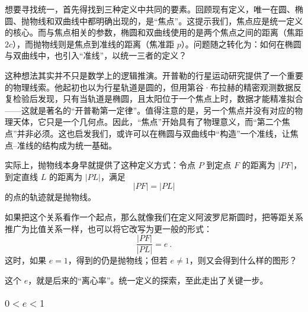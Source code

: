 想要寻找统一，首先得找到三种定义中共同的要素。回顾现有定义，唯一在圆、椭圆、抛物线和双曲线中都明确出现的，是“焦点”。这提示我们，焦点应是统一定义的核心。而与焦点相关的参数，椭圆和双曲线使用的是两个焦点之间的距离（焦距 $2c$），而抛物线则是焦点到准线的距离（焦准距 $p$）。问题随之转化为：如何在椭圆与双曲线中，也引入“准线”，以统一三者的定义？

这种想法其实并不只是数学上的逻辑推演。开普勒的行星运动研究提供了一个重要的物理线索。他起初也以为行星轨道是圆的，但用第谷·布拉赫的精密观测数据反复检验后发现，只有当轨道是椭圆，且太阳位于一个焦点上时，数据才能精准拟合——这就是著名的“开普勒第一定律”。值得注意的是，另一个焦点并没有对应的物理天体，它只是一个几何点。因此，“焦点”开始具有了物理意义，而“第二个焦点”并非必须。这也启发我们，或许可以在椭圆与双曲线中“构造”一个准线，让焦点–准线的结构成为统一基础。

实际上，抛物线本身早就提供了这种定义方式：令点 $P$ 到定点 $F$ 的距离为 $|PF|$，到定直线 $L$ 的距离为 $|PL|$，满足
$$
|PF| = |PL|
$$
的点的轨迹就是抛物线。

如果把这个关系看作一个起点，那么就像我们在定义阿波罗尼斯圆时，把等距关系推广为比值关系一样，也可以将它改写为更一般的形式：
$$
\frac{|PF|}{|PL|} = e~.
$$
这时，如果 $e = 1$，得到的仍是抛物线；但若 $e \ne 1$，则又会得到什么样的图形？

这个 $e$，就是后来的“离心率”。统一定义的探索，至此走出了关键一步。


\subsubsection{$0<e<1$}

